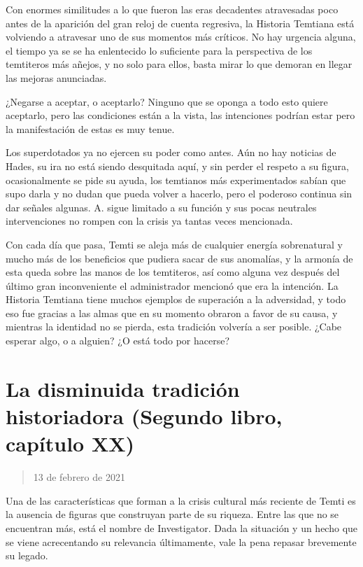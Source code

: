 \documentclass[
]{book}
\begin{document}
Con enormes similitudes a lo que fueron las eras decadentes atravesadas poco antes de la aparición del gran reloj de cuenta regresiva, la Historia Temtiana está volviendo a atravesar uno de sus momentos más críticos. No hay urgencia alguna, el tiempo ya se se ha enlentecido lo suficiente para la perspectiva de los temtiteros más añejos, y no solo para ellos, basta mirar lo que demoran en llegar las mejoras anunciadas.

¿Negarse a aceptar, o aceptarlo? Ninguno que se oponga a todo esto quiere aceptarlo, pero las condiciones están a la vista, las intenciones podrían estar pero la manifestación de estas es muy tenue.

Los superdotados ya no ejercen su poder como antes. Aún no hay noticias de Hades, su ira no está siendo desquitada aquí, y sin perder el respeto a su figura, ocasionalmente se pide su ayuda, los temtianos más experimentados sabían que supo darla y no dudan que pueda volver a hacerlo, pero el poderoso continua sin dar señales algunas. A. sigue limitado a su función y sus pocas neutrales intervenciones no rompen con la crisis ya tantas veces mencionada.

Con cada día que pasa, Temti se aleja más de cualquier energía sobrenatural y mucho más de los beneficios que pudiera sacar de sus anomalías, y la armonía de esta queda sobre las manos de los temtiteros, así como alguna vez después del último gran inconveniente el administrador mencionó que era la intención. La Historia Temtiana tiene muchos ejemplos de superación a la adversidad, y todo eso fue gracias a las almas que en su momento obraron a favor de su causa, y mientras la identidad no se pierda, esta tradición volvería a ser posible. ¿Cabe esperar algo, o a alguien? ¿O está todo por hacerse?

\hypertarget{la-disminuida-tradiciuxf3n-historiadora-segundo-libro-capuxedtulo-xx}{%
\section{La disminuida tradición historiadora (Segundo libro, capítulo XX)}\label{la-disminuida-tradiciuxf3n-historiadora-segundo-libro-capuxedtulo-xx}}

\begin{quote}
13 de febrero de 2021
\end{quote}

Una de las características que forman a la crisis cultural más reciente de Temti es la ausencia de figuras que construyan parte de su riqueza. Entre las que no se encuentran más, está el nombre de Investigator. Dada la situación y un hecho que se viene acrecentando su relevancia últimamente, vale la pena repasar brevemente su legado.
\end{document}
